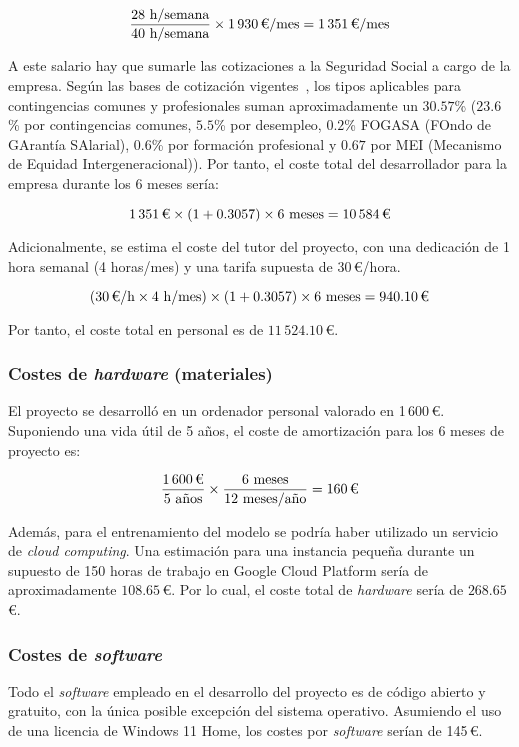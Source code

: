 \[\frac{28 \text{ h/semana}}{40 \text{ h/semana}} \times 1\,930 \text{\,€/mes} = 1\,351 \text{\,€/mes}\]

A este salario hay que sumarle las cotizaciones a la Seguridad Social a cargo de la empresa. Según las bases de cotización vigentes~\cite{segSocial2025}, los tipos aplicables para contingencias comunes y profesionales suman aproximadamente un $30.57$\% ($23.6$\% por contingencias comunes, $5.5$\% por desempleo, $0.2$\% FOGASA (FOndo de GArantía SAlarial),  $0.6$\% por formación profesional y $0.67$ por MEI (Mecanismo de Equidad Intergeneracional)). Por tanto, el coste total del desarrollador para la empresa durante los 6 meses sería:

\[1\,351 \text{\,€} \times (1 + 0.3057) \times 6 \text{ meses} = 10\,584 \text{\,€}\]

Adicionalmente, se estima el coste del tutor del proyecto, con una dedicación de 1 hora semanal (4 horas/mes) y una tarifa supuesta de 30\,€/hora.

\[(30 \text{\,€/h} \times 4 \text{ h/mes}) \times (1 + 0.3057) \times 6 \text{ meses} = 940.10 \text{\,€}\]

Por tanto, el coste total en personal es de $11\,524.10$\,€.

\subsubsection{Costes de \textit{hardware} (materiales)}

El proyecto se desarrolló en un ordenador personal valorado en 1\,600\,€. Suponiendo una vida útil de 5 años, el coste de amortización para los 6 meses de proyecto es:

\[\frac{1\,600 \text{\,€}}{5 \text{ años}} \times \frac{6 \text{ meses}}{12 \text{ meses/año}} = 160 \text{\,€}\]

Además, para el entrenamiento del modelo se podría haber utilizado un servicio de \textit{cloud computing}. Una estimación para una instancia pequeña durante un supuesto de 150 horas de trabajo en Google Cloud Platform sería de aproximadamente $108.65$\,€. Por lo cual, el coste total de \textit{hardware} sería de $268.65$\,€.

\subsubsection{Costes de \textit{software}}

Todo el \textit{software} empleado en el desarrollo del proyecto es de código abierto y gratuito, con la única posible excepción del sistema operativo. Asumiendo el uso de una licencia de Windows 11 Home, los costes por \textit{software} serían de 145\,€.

